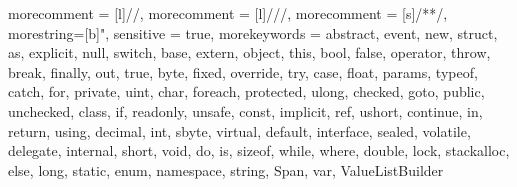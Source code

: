 \newcommand\eqby[1]{\mathrel{\stackrel{\makebox[0pt]{\mbox{\normalfont\tiny #1}}}{=}}}
\newcommand\eqbyref[1]{\mathrel{\stackrel{\makebox[0pt]{\mbox{\normalfont\tiny\eqref{#1}}}}{=}}}
\newcommand\restr[2]{{%
  \left.\kern-\nulldelimiterspace %
  #1 %
  \vphantom{\big|} %
  \right|_{#2} %
  }}

\newcommand{\csharp}{\textsc{C\#}}
\newcommand{\java}{\textsc{Java}}
\newcommand{\scala}{\textsc{Scala}}
\newcommand{\dotnet}{\textsc{.NET}}
\newcommand{\clang}{\textsc{C}}
\newcommand{\cpplang}{\textsc{C++}}
\newcommand{\coq}{\textsc{Coq}}

{
 morecomment = [l]{//}, 
 morecomment = [l]{///},
 morecomment = [s]{/*}{*/},
 morestring=[b]", 
 sensitive = true,
 morekeywords = {abstract,  event,  new,  struct,
  as,  explicit,  null,  switch,
  base,  extern,  object,  this,
  bool,  false,  operator,  throw,
  break,  finally,  out,  true,
  byte,  fixed,  override,  try,
  case,  float,  params,  typeof,
  catch,  for,  private,  uint,
  char,  foreach,  protected,  ulong,
  checked,  goto,  public,  unchecked,
  class,  if,  readonly,  unsafe,
  const,  implicit,  ref,  ushort,
  continue,  in,  return,  using,
  decimal,  int,  sbyte,  virtual,
  default,  interface,  sealed,  volatile,
  delegate,  internal,  short,  void,
  do,  is,  sizeof,  while, where,
  double,  lock,  stackalloc,   
  else,  long,  static,   
  enum,  namespace,  string, Span, var,
  ValueListBuilder}
}



\lstset{
   language=mycpp,
   extendedchars=true,
   basicstyle=\small\ttfamily,
   showstringspaces=false,
   showspaces=false,
   tabsize=2,
   breaklines=true,
   showtabs=false
}

